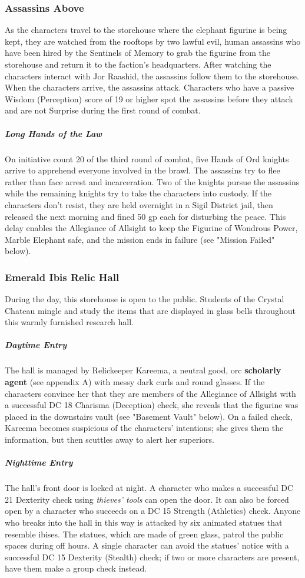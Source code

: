 \documentclass[10pt,a4paper,twoside,bg=print,twocolumn,openany,nodeprecatedcode]{dndbook}
\begin{document}
\subsubsection{Assassins Above}
As the characters travel to the storehouse where the elephant figurine is being kept, they are watched from the rooftops by two lawful evil, human assassins who have been hired by the Sentinels of Memory to grab the figurine from the storehouse and return it to the faction's headquarters. After watching the characters interact with Jor Raashid, the assassins follow them to the storehouse. When the characters arrive, the assassins attack. Characters who have a passive Wisdom (Perception) score of 19 or higher spot the assassins before they attack and are not Surprise during the first round of combat.

\subparagraph{Long Hands of the Law}
On initiative count 20 of the third round of combat, five Hands of Ord knights arrive to apprehend everyone involved in the brawl. The assassins try to flee rather than face arrest and incarceration. Two of the knights pursue the assassins while the remaining knights try to take the characters into custody. If the characters don't resist, they are held overnight in a Sigil District jail, then released the next morning and fined 50 gp each for disturbing the peace. This delay enables the Allegiance of Allsight to keep the Figurine of Wondrous Power, Marble Elephant safe, and the mission ends in failure (see "Mission Failed" below).

\subsubsection{Emerald Ibis Relic Hall}
During the day, this storehouse is open to the public. Students of the Crystal Chateau mingle and study the items that are displayed in glass bells throughout this warmly furnished research hall.

\subparagraph{Daytime Entry}
The hall is managed by Relickeeper Kareema, a neutral good, orc \textbf{scholarly agent} (see appendix A) with messy dark curls and round glasses. If the characters convince her that they are members of the Allegiance of Allsight with a successful DC 18 Charisma (Deception) check, she reveals that the figurine was placed in the downstairs vault (see "Basement Vault" below). On a failed check, Kareema becomes suspicious of the characters' intentions; she gives them the information, but then scuttles away to alert her superiors.

\subparagraph{Nighttime Entry}
The hall's front door is locked at night. A character who makes a successful DC 21 Dexterity check using \textit{thieves' tools} can open the door. It can also be forced open by a character who succeeds on a DC 15 Strength (Athletics) check. Anyone who breaks into the hall in this way is attacked by six animated statues that resemble ibises. The statues, which are made of green glass, patrol the public spaces during off hours. A single character can avoid the statues' notice with a successful DC 15 Dexterity (Stealth) check; if two or more characters are present, have them make a group check instead.
\end{document}
